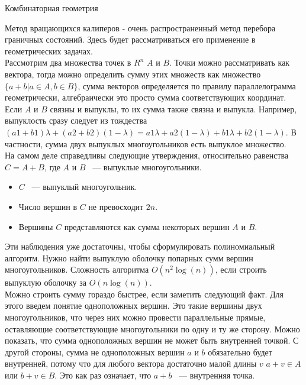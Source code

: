  Комбинаторная геометрия

Метод вращающихся калиперов - очень распространенный метод перебора
граничных состояний. Здесь будет рассматриваться его применение
в геометрических задачах.\\

Рассмотрим два множества точек в $R^n$ $A$ и $B$. Точки можно рассматривать
как вектора, тогда можно определить сумму этих
множеств как множество $\{ a + b | a \in A, b \in B\}$, сумма векторов
определяется по правилу параллелограмма геометрически,
алгебраически это просто сумма соответствующих координат.
Если $A$ и $B$ связны и выпуклы,
то их сумма также связна и выпукла. Например, выпуклость сразу
следует из тождества $(a1 + b1) \lambda + (a2 + b2) (1 - \lambda) =
a1 \lambda + a2 (1 - \lambda) + b1 \lambda + b2 (1 - \lambda)$.
В частности, сумма двух выпуклых многоугольников есть
выпуклое множество.\\

На самом деле справедливы следующие утверждения, относительно
равенства $C = A + B$, где $A$ и $B$ ~--- выпуклые многоугольники.\\
\begin{itemize}
\item $C$ ~--- выпуклый многоугольник.
\item Число вершин в $C$ не превосходит $2n$.
\item Вершины $C$ представляются как сумма некоторых вершин $A$ и $B$.
\end{itemize}

Эти наблюдения уже достаточны, чтобы сформулировать полиномиальный
алгоритм. Нужно найти выпуклую оболочку попарных сумм вершин многоугольников.
Сложность алгоритма $O(n^2\log(n))$, если строить выпуклую оболочку за
$O(n\log(n))$.\\

Можно строить сумму гораздо быстрее, если заметить следующий факт. Для этого
введем понятие одноположных вершин. Это такие вершины двух многоугольников,
что через них можно провести параллельные прямые, оставляющие
соответствующие многоугольники по одну и ту же сторону. Можно показать,
что сумма одноположных вершин не может быть внутренней точкой. С другой
стороны, сумма не одноположных вершин $a$ и $b$ обязательно будет внутренней,
потому что для любого вектора достаточно малой длины $v$ $a + v \in A$ или
$b + v \in B$. Это как раз означает, что $a + b$ ~--- внутренняя точка.\\

